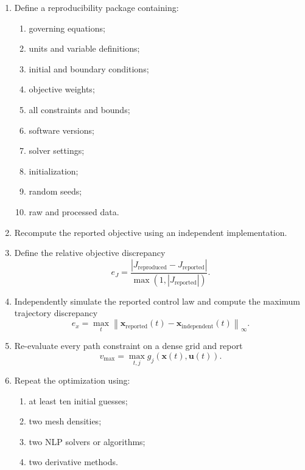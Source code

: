 \begin{enumerate}
    \item Define a reproducibility package containing:
    \begin{enumerate}
        \item governing equations;
        \item units and variable definitions;
        \item initial and boundary conditions;
        \item objective weights;
        \item all constraints and bounds;
        \item software versions;
        \item solver settings;
        \item initialization;
        \item random seeds;
        \item raw and processed data.
    \end{enumerate}

    \item Recompute the reported objective using an independent implementation.

    \item Define the relative objective discrepancy
    \begin{equation}
    e_J
    =
    \frac{
    |J_{\mathrm{reproduced}}-J_{\mathrm{reported}}|
    }{
    \max(1,|J_{\mathrm{reported}}|)
    }.
    \end{equation}

    \item Independently simulate the reported control law and compute the
    maximum trajectory discrepancy
    \begin{equation}
    e_x
    =
    \max_t
    \left\|
    \mathbf{x}_{\mathrm{reported}}(t)
    -
    \mathbf{x}_{\mathrm{independent}}(t)
    \right\|_{\infty}.
    \end{equation}

    \item Re-evaluate every path constraint on a dense grid and report
    \begin{equation}
    v_{\max}
    =
    \max_{t,j}
    g_j
    \left(
    \mathbf{x}(t),
    \mathbf{u}(t)
    \right).
    \end{equation}

    \item Repeat the optimization using:
    \begin{enumerate}
        \item at least ten initial guesses;
        \item two mesh densities;
        \item two NLP solvers or algorithms;
        \item two derivative methods.
    \end{enumerate}


\end{enumerate}
